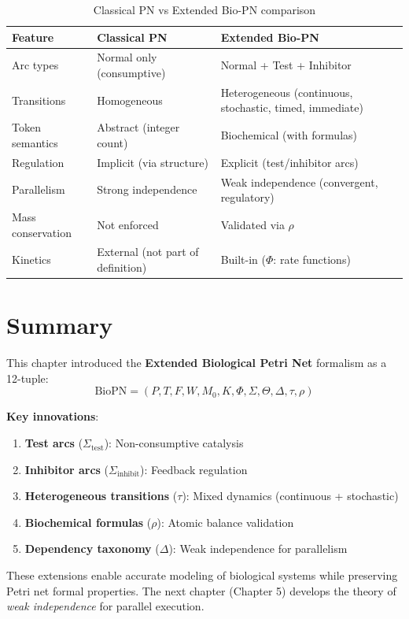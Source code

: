 \begin{table}[htbp]
\centering
\caption{Classical PN vs Extended Bio-PN comparison}
\label{tab:classical-vs-extended}
\begin{tabular}{p{4cm}p{4.5cm}p{4.5cm}}
\toprule
\textbf{Feature} & \textbf{Classical PN} & \textbf{Extended Bio-PN} \\
\midrule
Arc types & Normal only (consumptive) & Normal + Test + Inhibitor \\
Transitions & Homogeneous & Heterogeneous (continuous, stochastic, timed, immediate) \\
Token semantics & Abstract (integer count) & Biochemical (with formulas) \\
Regulation & Implicit (via structure) & Explicit (test/inhibitor arcs) \\
Parallelism & Strong independence & Weak independence (convergent, regulatory) \\
Mass conservation & Not enforced & Validated via $\rho$ \\
Kinetics & External (not part of definition) & Built-in ($\Phi$: rate functions) \\
\bottomrule
\end{tabular}
\end{table}

\section{Summary}
\label{sec:chapter4-summary}

This chapter introduced the \textbf{Extended Biological Petri Net} formalism as a 12-tuple:
%
\[
\text{BioPN} = (P, T, F, W, M_0, K, \Phi, \Sigma, \Theta, \Delta, \tau, \rho)
\]

\noindent\textbf{Key innovations}:
\begin{enumerate}
    \item \textbf{Test arcs} ($\Sigma_{\text{test}}$): Non-consumptive catalysis
    \item \textbf{Inhibitor arcs} ($\Sigma_{\text{inhibit}}$): Feedback regulation
    \item \textbf{Heterogeneous transitions} ($\tau$): Mixed dynamics (continuous + stochastic)
    \item \textbf{Biochemical formulas} ($\rho$): Atomic balance validation
    \item \textbf{Dependency taxonomy} ($\Delta$): Weak independence for parallelism
\end{enumerate}

These extensions enable accurate modeling of biological systems while preserving Petri net formal properties. The next chapter (Chapter 5) develops the theory of \emph{weak independence} for parallel execution.
